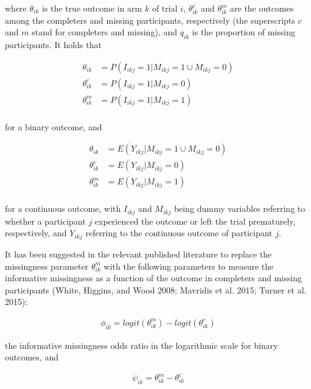 where \(\theta_{ik}\) is the true outcome in arm \(k\) of trial \(i\), \(\theta^{c}_{ik}\)
and \(\theta^{m}_{ik}\) are the outcomes among the completers and missing participants,
respectively (the superscripts \(c\) and \(m\) stand for completers and missing), and
\(q_{ik}\) is the proportion of missing participants. It holds that

\[\begin{aligned}
\theta_{ik} &= P(I_{ikj} = 1 | M_{ikj} = 1 \cup M_{ikj} = 0) \\
\theta^{c}_{ik} &= P(I_{ikj} = 1 | M_{ikj} = 0) \\
\theta^{m}_{ik} &= P(I_{ikj} = 1 | M_{ikj} = 1) \\
\end{aligned}\]

for a binary outcome, and

\[\begin{aligned}
\theta_{ik} &= E(Y_{ikj} | M_{ikj} = 1 \cup M_{ikj} = 0) \\
\theta^{c}_{ik} &= E(Y_{ikj} | M_{ikj} = 0) \\
\theta^{m}_{ik} &= E(Y_{ikj} | M_{ikj} = 1) \\
\end{aligned}\]

for a continuous outcome, with \(I_{ikj}\) and \(M_{ikj}\) being dummy variables
referring to whether a participant \(j\) experienced the outcome or left the trial
prematurely, respectively, and \(Y_{ikj}\) referring to the continuous outcome of
participant \(j\).

It has been suggested in the relevant published literature to replace the missingness
parameter \(\theta^{m}_{ik}\) with the following parameters to measure the informative
missingness as a function of the outcome in completers and missing participants
(White, Higgins, and Wood 2008; Mavridis et al. 2015; Turner et al. 2015):

\[\begin{aligned}
\phi_{ik} = logit(\theta^{m}_{ik}) - logit(\theta^{c}_{ik})
\end{aligned}\]

the informative missingness odds ratio in the logarithmic scale for binary outcomes,
and

\[\begin{aligned}
\psi_{ik} = \theta^{m}_{ik} - \theta^{c}_{ik}
\end{aligned}\]

